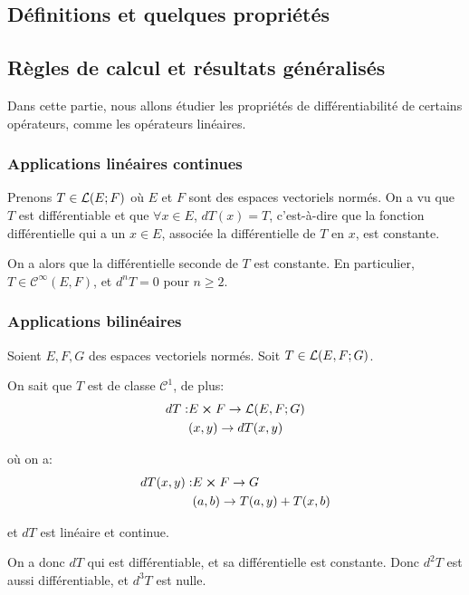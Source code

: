 \subsection{Définitions et quelques propriétés}

\subsection{Règles de calcul et résultats généralisés}

Dans cette partie, nous allons étudier les propriétés de différentiabilité de
certains opérateurs, comme les opérateurs linéaires.

\subsubsection{Applications linéaires continues}

Prenons $T \in \mathcal{L}(E; F)$ où $E$ et $F$ sont des espaces vectoriels
normés.
On a vu que $T$ est différentiable et que $\forall x \in E$, $dT(x) = T$,
c'est-à-dire que la fonction différentielle qui a un $x \in E$, associée la
différentielle de $T$ en $x$, est constante.

On a alors que la différentielle seconde de $T$ est constante. En particulier,
$T \in \mathcal{C}^{\infty}(E, F)$, et $d^{n}T = 0$ pour $n \geq 2$.

\subsubsection{Applications bilinéaires}

Soient $E, F, G$ des espaces vectoriels normés.
Soit $T \in \mathcal{L}(E, F; G)$.

On sait que $T$ est de classe $\mathcal{C}^{1}$, de plus:
\begin{align*}
	dT : & E \cross F \rightarrow \mathcal{L}(E, F; G) \\
	& (x, y) \rightarrow dT(x, y)
\end{align*}

où on a:
\begin{align*}
	dT(x, y) : & E \cross F \rightarrow G \\
	& (a, b) \rightarrow T(a, y) + T(x, b)
\end{align*}

et $dT$ est linéaire et continue.

On a donc $dT$ qui est différentiable, et sa différentielle est constante.
Donc $d^{2}T$ est aussi différentiable, et $d^{3}T$ est nulle.

